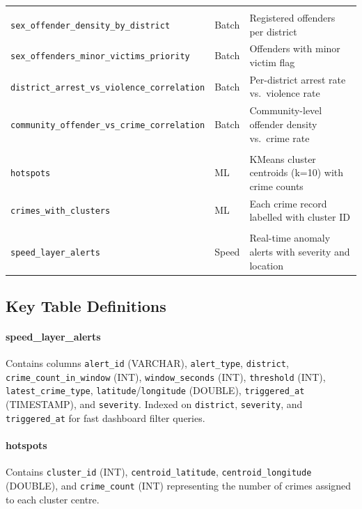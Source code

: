 \documentclass[11pt,a4paper]{article}
\begin{document}
\begin{longtable}{@{}L{4.6cm}L{1.8cm}L{7cm}@{}}
\addlinespace
{} \\
\texttt{sex\_offender\_density\_by\_district} & Batch & Registered offenders per district \\
\texttt{sex\_offenders\_minor\_victims\_priority} & Batch & Offenders with minor victim flag \\
\texttt{district\_arrest\_vs\_violence\_correlation} & Batch & Per-district arrest rate vs.\ violence rate \\
\texttt{community\_offender\_vs\_crime\_correlation} & Batch & Community-level offender density vs.\ crime rate \\
\addlinespace
{} \\
\texttt{hotspots}                        & ML    & KMeans cluster centroids (k=10) with crime counts \\
\texttt{crimes\_with\_clusters}          & ML    & Each crime record labelled with cluster ID \\
\addlinespace
{} \\
\texttt{speed\_layer\_alerts}            & Speed & Real-time anomaly alerts with severity and location \\
\end{longtable}

\subsection{Key Table Definitions}

\paragraph{speed\_layer\_alerts} Contains columns \texttt{alert\_id} (VARCHAR),
\texttt{alert\_type}, \texttt{district}, \texttt{crime\_count\_in\_window}
(INT), \texttt{window\_seconds} (INT), \texttt{threshold} (INT),
\texttt{latest\_crime\_type}, \texttt{latitude}/\texttt{longitude} (DOUBLE),
\texttt{triggered\_at} (TIMESTAMP), and \texttt{severity}. Indexed on
\texttt{district}, \texttt{severity}, and \texttt{triggered\_at} for fast
dashboard filter queries.

\paragraph{hotspots} Contains \texttt{cluster\_id} (INT),
\texttt{centroid\_latitude}, \texttt{centroid\_longitude} (DOUBLE), and
\texttt{crime\_count} (INT) representing the number of crimes assigned to
each cluster centre.
\end{document}
